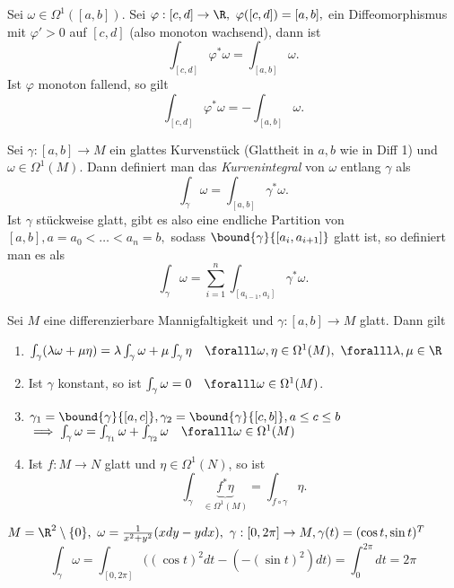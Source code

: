 \begin{lem}
	Sei $ \omega \in \Omega^1([a,b]) $. Sei $ \varphi:[c,d] \to \R,\ \varphi([c,d]) = [a,b], $ ein Diffeomorphismus mit $\varphi' > 0$ auf $[c,d]$ (also monoton wachsend), dann ist
	\[ \int_{[c,d]} \varphi^*\omega = \int_{[a,b]} \omega. \]
	Ist $\varphi$ monoton fallend, so gilt
	\[ \int_{[c,d]} \varphi^*\omega = - \int_{[a,b]} \omega. \]
\end{lem}

\begin{defn}[Kurvenintegral]
	Sei $ \gamma: [a,b] \to M $ ein glattes Kurvenstück (Glattheit in $a,b$ wie in Diff 1) und $\omega \in \Omega^1(M)$. Dann definiert man das \emph{Kurvenintegral} von $\omega$ entlang $\gamma$ als
	\[ \int_\gamma \omega = \int_{[a,b]} \gamma^*\omega. \]
	Ist $\gamma$ stückweise glatt, gibt es also eine endliche Partition von $[a,b], a=a_0 < \dots < a_n = b,$ sodass $\bound{\gamma}{[a_i,a_{i+1}]}$ glatt ist, so definiert man es als 
	$$ \int_{\gamma} \omega = \sum_{i=1}^{n} \int_{[a_{i-1},a_i]} \gamma^*\omega. $$
\end{defn}

\begin{lem}
	Sei $M$ eine differenzierbare Mannigfaltigkeit und $\gamma: [a,b] \to M$ glatt. Dann gilt
	\begin{enumerate}[label={\roman*})]
		\item $ \int_\gamma (\lambda \omega + \mu \eta) = \lambda \int_\gamma \omega + \mu \int_\gamma \eta \quad \foralll \omega,\eta \in \Omega^1(M), \ \foralll \lambda,\mu \in \R $
		\item Ist $\gamma$ konstant, so ist $ \int_\gamma \omega = 0 \quad \foralll \omega \in \Omega^1(M) $.
		\item $ \gamma_1 = \bound{\gamma}{[a,c]}, \gamma_2 = \bound{\gamma}{[c,b]}, a \leq c \leq b $\\
			$ \implies \int_\gamma \omega = \int_{\gamma_1} \omega + \int_{\gamma_2} \omega\quad \foralll \omega \in \Omega^1(M) $
		\item Ist $ f: M \to N $ glatt und $\eta \in \Omega^1(N)$, so ist
		\[ \int_\gamma \underbrace{f^*\eta}_{\in \Omega^1(M)} = \int_{f \circ \gamma} \eta. \]
	\end{enumerate}
\end{lem}

\begin{exmp*}
	$ M = \R^2 \setminus \{0\},\ \omega = \frac{1}{x^2+y^2}(xdy-ydx),\ \gamma: [0,2\pi] \to M, \gamma(t) = (\cos t,\sin t)^T $\\
	\[ \int_\gamma \omega = \int_{[0,2\pi]} \Big( (\cos t)^2 dt - \left(-(\sin t)^2 \right) dt \Big) = \int_0^{2\pi} dt = 2\pi \]
\end{exmp*}

